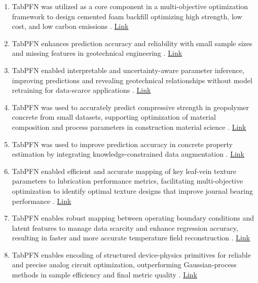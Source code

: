 \begin{enumerate}
\item TabPFN was utilized as a core component in a multi-objective optimization framework to design cemented foam backfill optimizing high strength, low cost, and low carbon emissions  \cite{wang2026cleaner}. \href{https://doi.org/10.1016/j.jclepro.2026.148119}{Link}

\item TabPFN enhances prediction accuracy and reliability with small sample sizes and missing features in geotechnical engineering \cite{wang2026predicting}. \href{https://doi.org/10.1007/s00603-026-05420-3}{Link}

\item TabPFN enabled interpretable and uncertainty-aware parameter inference, improving predictions and revealing geotechnical relationships without model retraining for data-scarce applications \cite{saito2026tabpfnextensionsinterpretablegeotechnical}. \href{http://arxiv.org/abs/2603.21033v1}{Link}

\item TabPFN was used to accurately predict compressive strength in geopolymer concrete from small datasets, supporting optimization of material composition and process parameters in construction material science \cite{stelmakh2025compressive}. \href{https://doi.org/10.3390/a18120744}{Link}

\item TabPFN was used to improve prediction accuracy in concrete property estimation by integrating knowledge-constrained data augmentation \cite{deng2026enhancing}. \href{https://doi.org/10.1016/j.asoc.2026.115037}{Link}

\item TabPFN enabled efficient and accurate mapping of key leaf-vein texture parameters to lubrication performance metrics, facilitating multi-objective optimization to identify optimal texture designs that improve journal bearing performance \cite{yin2026surrogateassisted}. \href{https://doi.org/10.1016/j.triboint.2026.111936}{Link}

\item TabPFN enables robust mapping between operating boundary conditions and latent features to manage data scarcity and enhance regression accuracy, resulting in faster and more accurate temperature field reconstruction \cite{mao2026datadriven}. \href{https://doi.org/10.3390/app16042029}{Link}

\item TabPFN enables encoding of structured device-physics primitives for reliable and precise analog circuit optimization, outperforming Gaussian-process methods in sample efficiency and final metric quality \cite{liu2025exploitingfunctionfamilystructureanalog}. \href{http://arxiv.org/abs/2512.00712v1}{Link}


\end{enumerate}
